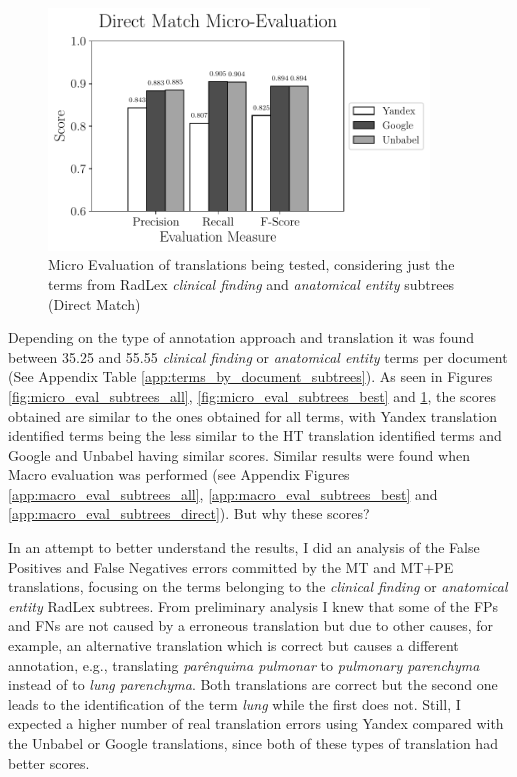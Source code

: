 \begin{figure}
	\centering
	\includegraphics[width=0.9\textwidth]{SupportFiles/plots/direct_match_micro_clinical_anatomical_subtrees_plot.pdf}
	\caption{Micro Evaluation of translations being tested, considering just the terms from RadLex \textit{clinical finding} and \textit{anatomical entity} subtrees (Direct Match)}
	\label{fig:micro_eval_subtrees_direct}
\end{figure}

Depending on the type of annotation approach and translation it was found between 35.25 and 55.55 \textit{clinical finding} or \textit{anatomical entity} terms per document (See Appendix Table \ref{app:terms_by_document_subtrees}). As seen in Figures \ref{fig:micro_eval_subtrees_all}, \ref{fig:micro_eval_subtrees_best} and \ref{fig:micro_eval_subtrees_direct}, the scores obtained are similar to the ones obtained for all terms, with Yandex translation identified terms being the less similar to the HT translation identified terms and Google and Unbabel having similar scores. Similar results were found when Macro evaluation was performed (see Appendix Figures \ref{app:macro_eval_subtrees_all}, \ref{app:macro_eval_subtrees_best} and \ref{app:macro_eval_subtrees_direct}). But why these scores? 

In an attempt to better understand the results, I did an analysis of the False Positives and False Negatives errors committed by the MT and MT+PE translations, focusing on the terms belonging to the \textit{clinical finding} or \textit{anatomical entity} RadLex subtrees. From preliminary analysis I knew that some of the FPs and FNs are not caused by a erroneous translation but due to other causes, for example, an alternative translation which is correct but causes a different annotation, e.g., translating \textit{parênquima pulmonar} to \textit{pulmonary parenchyma} instead of to \textit{lung parenchyma}. Both translations are correct but the second one leads to the identification of the term \textit{lung} while the first does not. Still, I expected a higher number of real translation errors using Yandex compared with the Unbabel or Google translations, since both of these types of translation had better scores.

